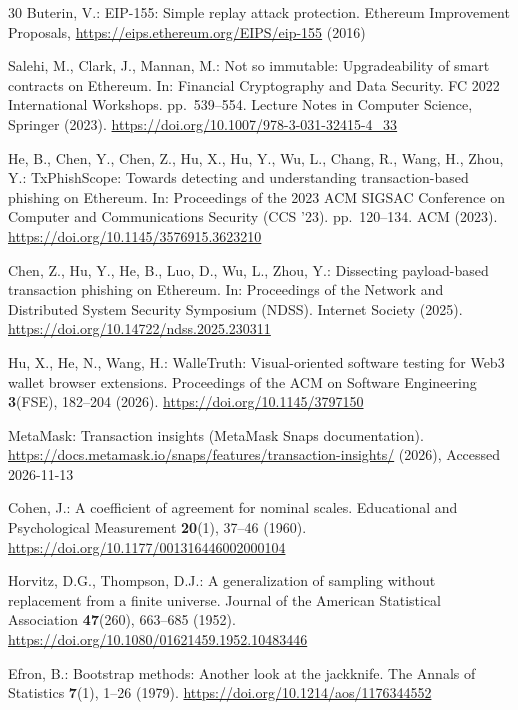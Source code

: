 \documentclass[runningheads]{llncs}
\begin{document}
\begin{thebibliography}{30}
Buterin, V.: EIP-155: Simple replay attack protection. Ethereum Improvement Proposals, \url{https://eips.ethereum.org/EIPS/eip-155} (2016)

Salehi, M., Clark, J., Mannan, M.: Not so immutable: Upgradeability of smart contracts on Ethereum. In: Financial Cryptography and Data Security. FC 2022 International Workshops. pp.~539--554. Lecture Notes in Computer Science, Springer (2023). \url{https://doi.org/10.1007/978-3-031-32415-4_33}

He, B., Chen, Y., Chen, Z., Hu, X., Hu, Y., Wu, L., Chang, R., Wang, H., Zhou, Y.: TxPhishScope: Towards detecting and understanding transaction-based phishing on Ethereum. In: Proceedings of the 2023 ACM SIGSAC Conference on Computer and Communications Security (CCS '23). pp.~120--134. ACM (2023). \url{https://doi.org/10.1145/3576915.3623210}

Chen, Z., Hu, Y., He, B., Luo, D., Wu, L., Zhou, Y.: Dissecting payload-based transaction phishing on Ethereum. In: Proceedings of the Network and Distributed System Security Symposium (NDSS). Internet Society (2025). \url{https://doi.org/10.14722/ndss.2025.230311}

Hu, X., He, N., Wang, H.: WalleTruth: Visual-oriented software testing for Web3 wallet browser extensions. Proceedings of the ACM on Software Engineering \textbf{3}(FSE), 182--204 (2026). \url{https://doi.org/10.1145/3797150}

MetaMask: Transaction insights (MetaMask Snaps documentation). \url{https://docs.metamask.io/snaps/features/transaction-insights/} (2026), Accessed 2026-11-13

Cohen, J.: A coefficient of agreement for nominal scales. Educational and Psychological Measurement \textbf{20}(1), 37--46 (1960). \url{https://doi.org/10.1177/001316446002000104}

Horvitz, D.G., Thompson, D.J.: A generalization of sampling without replacement from a finite universe. Journal of the American Statistical Association \textbf{47}(260), 663--685 (1952). \url{https://doi.org/10.1080/01621459.1952.10483446}

Efron, B.: Bootstrap methods: Another look at the jackknife. The Annals of Statistics \textbf{7}(1), 1--26 (1979). \url{https://doi.org/10.1214/aos/1176344552}


\end{thebibliography}
\end{document}
